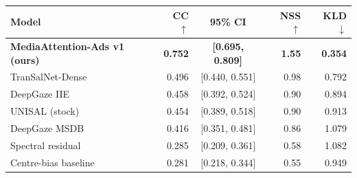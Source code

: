 \begin{tabular}{lrcrr}
\toprule
Model & CC $\uparrow$ & 95\% CI & NSS $\uparrow$ & KLD $\downarrow$ \\
\midrule
\textbf{MediaAttention-Ads v1 (ours)} & \textbf{0.752} & \textbf{[0.695, 0.809]} & \textbf{1.55} & \textbf{0.354} \\
TranSalNet-Dense & 0.496 & [0.440, 0.551] & 0.98 & 0.792 \\
DeepGaze IIE & 0.458 & [0.392, 0.524] & 0.90 & 0.894 \\
UNISAL (stock) & 0.454 & [0.389, 0.518] & 0.90 & 0.913 \\
DeepGaze MSDB & 0.416 & [0.351, 0.481] & 0.86 & 1.079 \\
Spectral residual & 0.285 & [0.209, 0.361] & 0.58 & 1.082 \\
Centre-bias baseline & 0.281 & [0.218, 0.344] & 0.55 & 0.949 \\
\bottomrule
\end{tabular}
